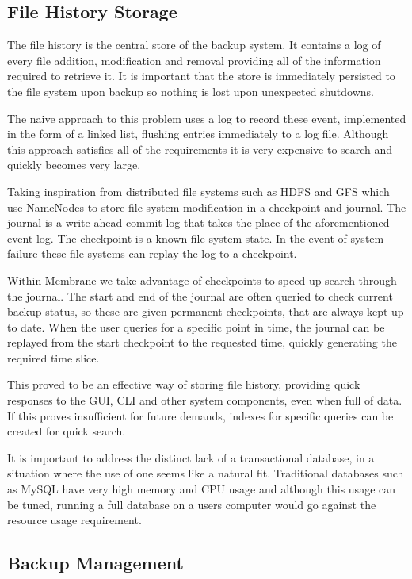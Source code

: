 \documentclass[11pt, a4paper, twocolumn, twoside]{report}
\begin{document}
\subsection{File History Storage}

The file history is the central store of the backup system. It contains a log of every file addition, modification and removal providing all of the information required to retrieve it. It is important that the store is immediately persisted to the file system upon backup so nothing is lost upon unexpected shutdowns.

The naive approach to this problem uses a log to record these event, implemented in the form of a linked list, flushing entries immediately to a log file. Although this approach satisfies all of the requirements it is very expensive to search and quickly becomes very large.

Taking inspiration from distributed file systems such as HDFS \citep{hdfsAnalysis} and GFS \citep{mckusick2010gfs} which use NameNodes to store file system modification in a checkpoint and journal. The journal is a write-ahead commit log that takes the place of the aforementioned event log. The checkpoint is a known file system state. In the event of system failure these file systems can replay the log to a checkpoint. 

Within Membrane we take advantage of checkpoints to speed up search through the journal. The start and end of the journal are often queried to check current backup status, so these are given permanent checkpoints, that are always kept up to date. When the user queries for a specific point in time, the journal can be replayed from the start checkpoint to the requested time, quickly generating the required time slice.

This proved to be an effective way of storing file history, providing quick responses to the GUI, CLI and other system components, even when full of data. If this proves insufficient for future demands, indexes for specific queries can be created for quick search.

It is important to address the distinct lack of a transactional database, in a situation where the use of one seems like a natural fit. Traditional databases such as MySQL have very high memory and CPU usage \citep{james2017sql} and although this usage can be tuned, running a full database on a users computer would go against the resource usage requirement.

\subsection{Backup Management}
\end{document}
